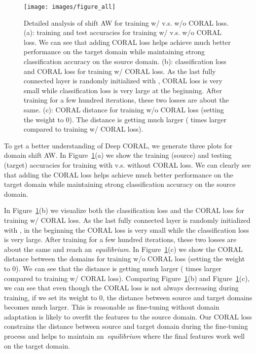 \documentclass[graybox]{svmult}
\begin{document}
\begin{figure}[t]
\centering
\texttt{[image: images/figure\_all]}
\caption{Detailed analysis of shift AW for training w/ v.s. w/o CORAL loss. (a): training and test accuracies for training w/ v.s. w/o CORAL loss. We can see that adding CORAL loss helps achieve much better performance on the target domain while maintaining strong classification accuracy on the source domain. (b): classification loss and CORAL loss for training w/ CORAL loss. As the last fully connected layer is randomly initialized with , CORAL loss is very small while classification loss is very large at the beginning. After training for a few hundred iterations, these two losses are about the same. (c): CORAL distance for training w/o CORAL loss  (setting the weight to 0). The distance is getting much larger ( times larger compared to training w/ CORAL loss).}
\label{fig:a_w}
\end{figure}

To get a better understanding of Deep CORAL, we generate three plots for domain shift AW. In Figure~\ref{fig:a_w}(a) we show the training (source) and testing (target) accuracies for training with v.s. without CORAL loss. We can clearly see that adding the CORAL loss helps achieve much better performance on the target domain while maintaining strong classification accuracy on the source domain. 

In Figure~\ref{fig:a_w}(b) we visualize both the classification loss and the CORAL loss for training w/ CORAL loss. As the last fully connected layer is randomly initialized with ,  in the beginning the CORAL loss is very small while the classification loss is very large. After training for a few hundred iterations, these two losses are about the same and reach an~\emph{equilibrium}. In Figure~\ref{fig:a_w}(c) we show the CORAL distance between the domains for training w/o CORAL loss (setting the weight to 0). We can see that the distance is getting much larger ( times larger compared to training w/ CORAL loss). Comparing Figure~\ref{fig:a_w}(b) and Figure~\ref{fig:a_w}(c), we can see that even though the CORAL loss is not always decreasing during training, if we set its weight to 0, the distance between source and target domains becomes much larger. This is reasonable as fine-tuning without domain adaptation is likely to overfit the features to the source domain. Our CORAL loss constrains the distance between source and target domain during the fine-tuning process and helps to maintain an~\emph{equilibrium} where the final features work well on the target domain.
\end{document}
